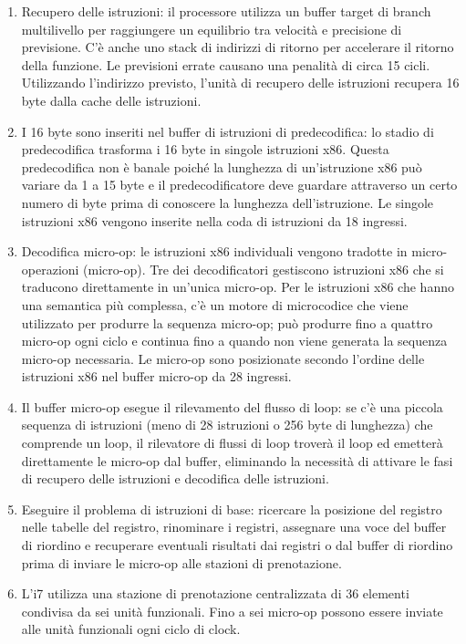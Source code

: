 \documentclass[12pt,a4paper]{article}
\begin{document}
\begin{enumerate}
\item Recupero delle istruzioni: il processore utilizza un buffer target di branch multilivello per raggiungere un equilibrio tra velocità e precisione di previsione. C'è anche uno stack di indirizzi di ritorno per accelerare il ritorno della funzione. Le previsioni errate causano una penalità di circa 15 cicli. Utilizzando l'indirizzo previsto, l'unità di recupero delle istruzioni recupera 16 byte dalla cache delle istruzioni.
\item I 16 byte sono inseriti nel buffer di istruzioni di predecodifica: lo stadio di predecodifica trasforma i 16 byte in singole istruzioni x86. Questa predecodifica non è banale poiché la lunghezza di un'istruzione x86 può variare da 1 a 15 byte e il predecodificatore deve guardare attraverso un certo numero di byte prima di conoscere la lunghezza dell'istruzione. Le singole istruzioni x86 vengono inserite nella coda di istruzioni da 18 ingressi.
\item Decodifica micro-op: le istruzioni x86 individuali vengono tradotte in micro-operazioni (micro-op). Tre dei decodificatori gestiscono istruzioni x86 che si traducono direttamente in un'unica micro-op. Per le istruzioni x86 che hanno una semantica più complessa, c'è un motore di microcodice che viene utilizzato per produrre la sequenza micro-op; può produrre fino a quattro micro-op ogni ciclo e continua fino a quando non viene generata la sequenza micro-op necessaria. Le micro-op sono posizionate secondo l'ordine delle istruzioni x86 nel buffer micro-op da 28 ingressi.
\item Il buffer micro-op esegue il rilevamento del flusso di loop: se c'è una piccola sequenza di istruzioni (meno di 28 istruzioni o 256 byte di lunghezza) che comprende un loop, il rilevatore di flussi di loop troverà il loop ed emetterà direttamente le micro-op dal buffer, eliminando la necessità di attivare le fasi di recupero delle istruzioni e decodifica delle istruzioni.
\item Eseguire il problema di istruzioni di base: ricercare la posizione del registro nelle tabelle del registro, rinominare i registri, assegnare una voce del buffer di riordino e recuperare eventuali risultati dai registri o dal buffer di riordino prima di inviare le micro-op alle stazioni di prenotazione.
\item L'i7 utilizza una stazione di prenotazione centralizzata di 36 elementi condivisa da sei unità funzionali. Fino a sei micro-op possono essere inviate alle unità funzionali ogni ciclo di clock.

\end{enumerate}
\end{document}
